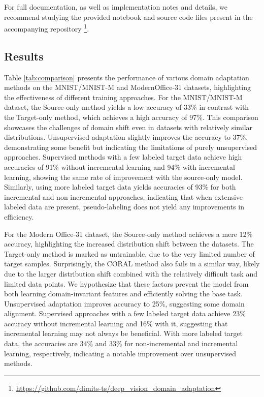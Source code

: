 \documentclass{article}
\begin{document}
	For full documentation, as well as implementation notes and details, we recommend studying the provided notebook and source code files present in the accompanying repository \footnote{\url{https://github.com/dimits-ts/deep\_vision\_domain\_adaptation}}.
	
	
	\subsection{Results}
	
	Table \ref{tab:comparison} presents the performance of various domain adaptation methods on the MNIST/MNIST-M and ModernOffice-31 datasets, highlighting the effectiveness of different training approaches. For the MNIST/MNIST-M dataset, the Source-only method yields a low accuracy of 33\% in contrast with the Target-only method, which achieves a high accuracy of 97\%. This comparison showcases the challenges of domain shift even in datasets with relatively similar distributions. Unsupervised adaptation slightly improves the accuracy to 37\%, demonstrating some benefit but indicating the limitations of purely unsupervised approaches. Supervised methods with a few labeled target data achieve high accuracies of 91\% without incremental learning and 94\% with incremental learning, showing the same rate of improvement with the source-only model. Similarly, using more labeled target data yields accuracies of 93\% for both incremental and non-incremental approaches, indicating that when extensive labeled data are present, pseudo-labeling does not yield any improvements in efficiency.
	
	For the Modern Office-31 dataset, the Source-only method achieves a mere 12\% accuracy, highlighting the increased distribution shift between the datasets. The Target-only method is marked as untrainable, due to the very limited number of target samples. Surprisingly, the CORAL method also fails in a similar way, likely due to the larger distribution shift combined with the relatively difficult task and limited data points. We hypothesize that these factors prevent the model from both learning domain-invariant features and efficiently solving the base task. Unsupervised adaptation improves accuracy to 25\%, suggesting some domain alignment. Supervised approaches with a few labeled target data achieve 23\% accuracy without incremental learning and 16\% with it, suggesting that incremental learning may not always be beneficial. With more labeled target data, the accuracies are 34\% and 33\% for non-incremental and incremental learning, respectively, indicating a notable improvement over unsupervised methods. 
	
\end{document}
